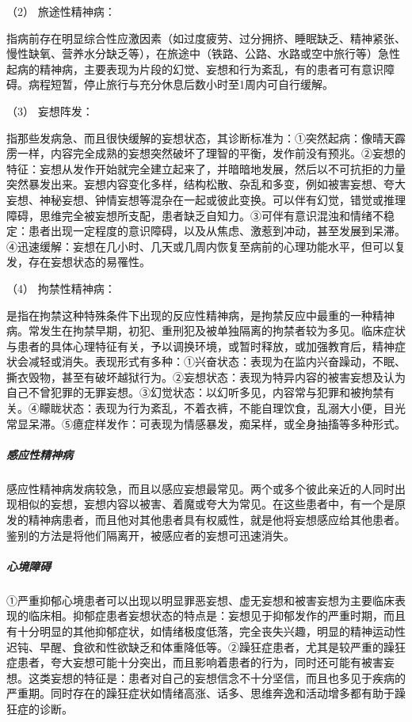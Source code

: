 \hypertarget{text00049.htmlux5cux23CHP1-18-7-2-1-2}{}
（2） 旅途性精神病：

指病前存在明显综合性应激因素（如过度疲劳、过分拥挤、睡眠缺乏、精神紧张、慢性缺氧、营养水分缺乏等），在旅途中（铁路、公路、水路或空中旅行等）急性起病的精神病，主要表现为片段的幻觉、妄想和行为紊乱，有的患者可有意识障碍。病程短暂，停止旅行与充分休息后数小时至1周内可自行缓解。

\hypertarget{text00049.htmlux5cux23CHP1-18-7-2-1-3}{}
（3） 妄想阵发：

指那些发病急、而且很快缓解的妄想状态，其诊断标准为：①突然起病：像晴天霹雳一样，内容完全成熟的妄想突然破坏了理智的平衡，发作前没有预兆。②妄想的特征：妄想从发作开始就完全建立起来了，并暗暗地发展，然后以不可抗拒的力量突然暴发出来。妄想内容变化多样，结构松散、杂乱和多变，例如被害妄想、夸大妄想、神秘妄想、钟情妄想等混杂在一起或彼此变换。可以伴有幻觉，错觉或推理障碍，思维完全被妄想所支配，患者缺乏自知力。③可伴有意识混浊和情绪不稳定：患者出现一定程度的意识障碍，以及从焦虑、激惹到冲动，甚至发展到呆滞。④迅速缓解：妄想在几小时、几天或几周内恢复至病前的心理功能水平，但可以复发，存在妄想状态的易罹性。

\hypertarget{text00049.htmlux5cux23CHP1-18-7-2-1-4}{}
（4） 拘禁性精神病：

是指在拘禁这种特殊条件下出现的反应性精神病，是拘禁反应中最重的一种精神病。常发生在拘禁早期，初犯、重刑犯及被单独隔离的拘禁者较为多见。临床症状与患者的具体心理特征有关，予以调换环境，或暂时释放，或加强教育后，精神症状会减轻或消失。表现形式有多种：①兴奋状态：表现为在监内兴奋躁动，不眠、撕衣毁物，甚至有破坏越狱行为。②妄想状态：表现为特异内容的被害妄想及认为自己不曾犯罪的无罪妄想。③幻觉状态：以幻听多见，内容常与犯罪和被拘禁有关。④矇眬状态：表现为行为紊乱，不着衣裤，不能自理饮食，乱溺大小便，目光常显呆滞。⑤癔症样发作：可表现为情感暴发，痴呆样，或全身抽搐等多种形式。

\subparagraph{感应性精神病}

感应性精神病发病较急，而且以感应妄想最常见。两个或多个彼此亲近的人同时出现相似的妄想，妄想内容以被害、着魔或夸大为常见。在这些患者中，有一个是原发的精神病患者，而且他对其他患者具有权威性，就是他将妄想感应给其他患者。鉴别的方法是将他们隔离开，被感应者的妄想可迅速消失。

\subparagraph{心境障碍}

①严重抑郁心境患者可以出现以明显罪恶妄想、虚无妄想和被害妄想为主要临床表现的临床相。抑郁症患者妄想状态的特点是：妄想见于抑郁发作的严重时期，而且有十分明显的其他抑郁症状，如情绪极度低落，完全丧失兴趣，明显的精神运动性迟钝、早醒、食欲和性欲缺乏和体重降低等。②躁狂症患者，尤其是较严重的躁狂症患者，夸大妄想可能十分突出，而且影响着患者的行为，同时还可能有被害妄想。这类妄想的特征是：患者对自己的妄想信念不十分坚信，而且也多见于疾病的严重期。同时存在的躁狂症状如情绪高涨、话多、思维奔逸和活动增多都有助于躁狂症的诊断。

